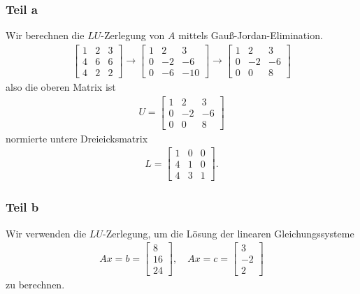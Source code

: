 \documentclass[fleqn,draft,a5paper]{article}
\theoremstyle{remark}
\begin{document}
  \subsubsection{Teil a}
  Wir berechnen die \(LU\)-Zerlegung von \(A\) mittels
  Gauß-Jordan-Elimination.
  \begin{align*}
  \begin{bmatrix}
    1 & 2 & 3 \\ 4 & 6 & 6 \\ 4 & 2 & 2
  \end{bmatrix}
    \to
    \begin{bmatrix}
      1 & 2 & 3 \\ 0 & -2 & -6 \\ 0 & -6 & -10
    \end{bmatrix}
    \to
    \begin{bmatrix}
      1 & 2 & 3 \\ 0 & -2 & -6 \\ 0 & 0 & 8
    \end{bmatrix}
  \end{align*}
  also die oberen Matrix ist
  \begin{align*}
    U = 
    \begin{bmatrix}
      1 & 2 & 3 \\ 0 & -2 & -6 \\ 0 & 0 & 8
    \end{bmatrix}
  \end{align*}
  normierte untere Dreieicksmatrix
  \begin{align*}
    L =
    \begin{bmatrix}
      1 & 0 & 0 \\ 4 & 1 & 0 \\ 4 & 3 & 1
    \end{bmatrix}.
  \end{align*}
  \subsubsection{Teil b}
  Wir verwenden die \(LU\)-Zerlegung, um die Lösung der linearen
  Gleichungssysteme
  \begin{align*}
    Ax = b =
    \begin{bmatrix}
      8 \\ 16 \\ 24
    \end{bmatrix},
    \quad
    Ax = c =
    \begin{bmatrix}
      3 \\ -2 \\ 2
    \end{bmatrix}
  \end{align*}
  zu berechnen.
\end{document}
